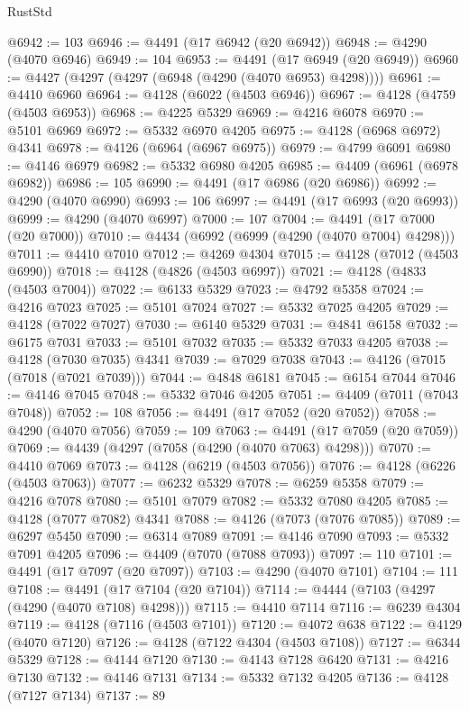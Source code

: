 \begin{lexlean}{RustStd}
\begin{coremodule}
@6942 := 103
@6946 := @4491 (@17 @6942 (@20 @6942))
@6948 := @4290 (@4070 @6946)
@6949 := 104
@6953 := @4491 (@17 @6949 (@20 @6949))
@6960 := @4427 (@4297 (@4297 (@6948 (@4290 (@4070 @6953) @4298))))
@6961 := @4410 @6960
@6964 := @4128 (@6022 (@4503 @6946))
@6967 := @4128 (@4759 (@4503 @6953))
@6968 := @4225 @5329
@6969 := @4216 @6078
@6970 := @5101 @6969
@6972 := @5332 @6970 @4205
@6975 := @4128 (@6968 @6972) @4341
@6978 := @4126 (@6964 (@6967 @6975))
@6979 := @4799 @6091
@6980 := @4146 @6979
@6982 := @5332 @6980 @4205
@6985 := @4409 (@6961 (@6978 @6982))
@6986 := 105
@6990 := @4491 (@17 @6986 (@20 @6986))
@6992 := @4290 (@4070 @6990)
@6993 := 106
@6997 := @4491 (@17 @6993 (@20 @6993))
@6999 := @4290 (@4070 @6997)
@7000 := 107
@7004 := @4491 (@17 @7000 (@20 @7000))
@7010 := @4434 (@6992 (@6999 (@4290 (@4070 @7004) @4298)))
@7011 := @4410 @7010
@7012 := @4269 @4304
@7015 := @4128 (@7012 (@4503 @6990))
@7018 := @4128 (@4826 (@4503 @6997))
@7021 := @4128 (@4833 (@4503 @7004))
@7022 := @6133 @5329
@7023 := @4792 @5358
@7024 := @4216 @7023
@7025 := @5101 @7024
@7027 := @5332 @7025 @4205
@7029 := @4128 (@7022 @7027)
@7030 := @6140 @5329
@7031 := @4841 @6158
@7032 := @6175 @7031
@7033 := @5101 @7032
@7035 := @5332 @7033 @4205
@7038 := @4128 (@7030 @7035) @4341
@7039 := @7029 @7038
@7043 := @4126 (@7015 (@7018 (@7021 @7039)))
@7044 := @4848 @6181
@7045 := @6154 @7044
@7046 := @4146 @7045
@7048 := @5332 @7046 @4205
@7051 := @4409 (@7011 (@7043 @7048))
@7052 := 108
@7056 := @4491 (@17 @7052 (@20 @7052))
@7058 := @4290 (@4070 @7056)
@7059 := 109
@7063 := @4491 (@17 @7059 (@20 @7059))
@7069 := @4439 (@4297 (@7058 (@4290 (@4070 @7063) @4298)))
@7070 := @4410 @7069
@7073 := @4128 (@6219 (@4503 @7056))
@7076 := @4128 (@6226 (@4503 @7063))
@7077 := @6232 @5329
@7078 := @6259 @5358
@7079 := @4216 @7078
@7080 := @5101 @7079
@7082 := @5332 @7080 @4205
@7085 := @4128 (@7077 @7082) @4341
@7088 := @4126 (@7073 (@7076 @7085))
@7089 := @6297 @5450
@7090 := @6314 @7089
@7091 := @4146 @7090
@7093 := @5332 @7091 @4205
@7096 := @4409 (@7070 (@7088 @7093))
@7097 := 110
@7101 := @4491 (@17 @7097 (@20 @7097))
@7103 := @4290 (@4070 @7101)
@7104 := 111
@7108 := @4491 (@17 @7104 (@20 @7104))
@7114 := @4444 (@7103 (@4297 (@4290 (@4070 @7108) @4298)))
@7115 := @4410 @7114
@7116 := @6239 @4304
@7119 := @4128 (@7116 (@4503 @7101))
@7120 := @4072 @638
@7122 := @4129 (@4070 @7120)
@7126 := @4128 (@7122 @4304 (@4503 @7108))
@7127 := @6344 @5329
@7128 := @4144 @7120
@7130 := @4143 @7128 @6420
@7131 := @4216 @7130
@7132 := @4146 @7131
@7134 := @5332 @7132 @4205
@7136 := @4128 (@7127 @7134)
@7137 := 89

\end{coremodule}
\end{lexlean}
